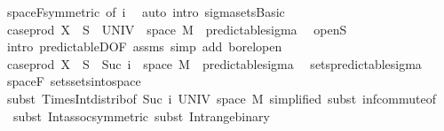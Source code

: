 \begin{isabellebody}
\ space{\isacharunderscore}{\kern0pt}F{\isacharbrackleft}{\kern0pt}symmetric{\isacharcomma}{\kern0pt}\ of\ i{\isacharbrackright}{\kern0pt}\ \isamarkupfalse%
\ {\isacharparenleft}{\kern0pt}auto\ intro{\isacharbang}{\kern0pt}{\isacharcolon}{\kern0pt}\ sigma{\isacharunderscore}{\kern0pt}sets{\isachardot}{\kern0pt}Basic{\isacharparenright}{\kern0pt}\isanewline
\ \ \ \ \isamarkupfalse%
\ \isamarkupfalse%
\ {\isachardoublequoteopen}case{\isacharunderscore}{\kern0pt}prod\ X\ {\isacharminus}{\kern0pt}{\isacharbackquote}{\kern0pt}\ S\ {\isasyminter}\ {\isacharparenleft}{\kern0pt}UNIV\ {\isasymtimes}\ space\ M{\isacharparenright}{\kern0pt}\ {\isasymin}\ predictable{\isacharunderscore}{\kern0pt}sigma{\isachardoublequoteclose}\ \isamarkupfalse%
\ open{\isacharunderscore}{\kern0pt}S\ \isamarkupfalse%
\ {\isacharparenleft}{\kern0pt}intro\ predictableD{\isacharbrackleft}{\kern0pt}OF\ assms{\isacharbrackright}{\kern0pt}{\isacharcomma}{\kern0pt}\ simp\ add{\isacharcolon}{\kern0pt}\ borel{\isacharunderscore}{\kern0pt}open{\isacharparenright}{\kern0pt}\isanewline
\ \ \ \ \isamarkupfalse%
\ \isamarkupfalse%
\ {\isachardoublequoteopen}case{\isacharunderscore}{\kern0pt}prod\ X\ {\isacharminus}{\kern0pt}{\isacharbackquote}{\kern0pt}\ S\ {\isasyminter}\ {\isacharparenleft}{\kern0pt}{\isacharbraceleft}{\kern0pt}Suc\ i{\isacharbraceright}{\kern0pt}\ {\isasymtimes}\ space\ M{\isacharparenright}{\kern0pt}\ {\isasymin}\ predictable{\isacharunderscore}{\kern0pt}sigma{\isachardoublequoteclose}\ \isamarkupfalse%
\ sets{\isacharunderscore}{\kern0pt}predictable{\isacharunderscore}{\kern0pt}sigma\ \isamarkupfalse%
\ space{\isacharunderscore}{\kern0pt}F\ sets{\isachardot}{\kern0pt}sets{\isacharunderscore}{\kern0pt}into{\isacharunderscore}{\kern0pt}space\isanewline
\ \ \ \ \ \ \isamarkupfalse%
\ {\isacharparenleft}{\kern0pt}subst\ Times{\isacharunderscore}{\kern0pt}Int{\isacharunderscore}{\kern0pt}distrib{}{\isacharbrackleft}{\kern0pt}of\ {\isachardoublequoteopen}{\isacharbraceleft}{\kern0pt}Suc\ i{\isacharbraceright}{\kern0pt}{\isachardoublequoteclose}\ UNIV\ {\isachardoublequoteopen}space\ M{\isachardoublequoteclose}{\isacharcomma}{\kern0pt}\ simplified{\isacharbrackright}{\kern0pt}{\isacharcomma}{\kern0pt}\ subst\ inf{\isachardot}{\kern0pt}commute{\isacharbrackleft}{\kern0pt}of\ {\isachardoublequoteopen}{\isacharunderscore}{\kern0pt}\ {\isasymtimes}\ {\isacharunderscore}{\kern0pt}{\isachardoublequoteclose}{\isacharbrackright}{\kern0pt}{\isacharcomma}{\kern0pt}\ subst\ Int{\isacharunderscore}{\kern0pt}assoc{\isacharbrackleft}{\kern0pt}symmetric{\isacharbrackright}{\kern0pt}{\isacharcomma}{\kern0pt}\ subst\ Int{\isacharunderscore}{\kern0pt}range{\isacharunderscore}{\kern0pt}binary{\isacharparenright}{\kern0pt}\ \isanewline

\end{isabellebody}
